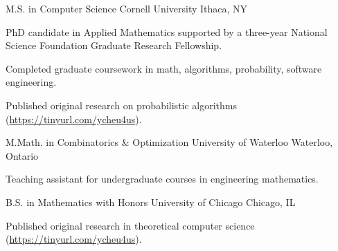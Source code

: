 

\begin{cventries}

  \cventry
    {M.S. in Computer Science} %
    {Cornell University} %
    {Ithaca, NY} %
    {} %
    {
      \begin{cvitems} %
        \item {PhD candidate in Applied Mathematics supported by a three-year National Science Foundation Graduate Research Fellowship.}
        \item {Completed graduate coursework in math, algorithms, probability, software engineering.}
        \item {Published original research on probabilistic algorithms (\url{https://tinyurl.com/ycheu4us}).}
      \end{cvitems}
    }

  \cventry
    {M.Math. in Combinatorics \& Optimization} %
    {University of Waterloo} %
    {Waterloo, Ontario} %
    {} %
    {
      \begin{cvitems} %
        \item {Teaching assistant for undergraduate courses in engineering mathematics.}
      \end{cvitems}
    }

  \cventry
    {B.S. in Mathematics with Honors} %
    {University of Chicago} %
    {Chicago, IL} %
    {} %
    {
      \begin{cvitems} %
        \item {Published original research in theoretical computer science (\url{https://tinyurl.com/ycheu4us}).}
      \end{cvitems}
    }

\end{cventries}
